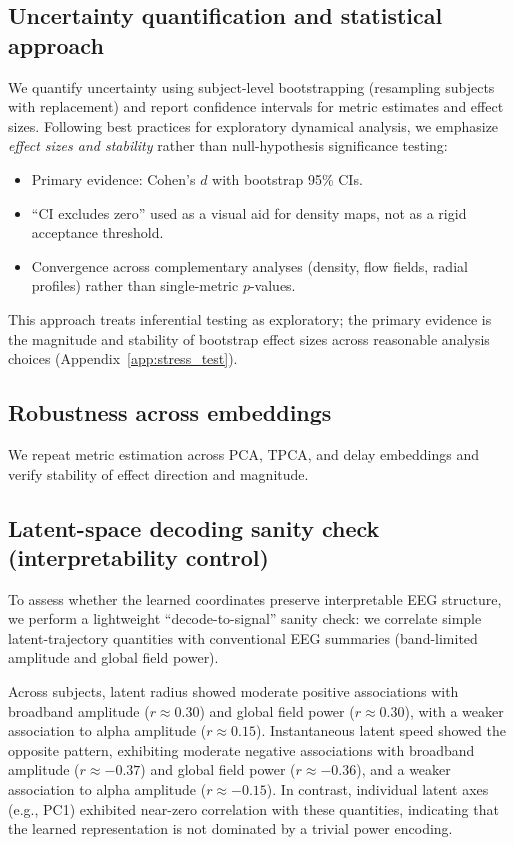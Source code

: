 \documentclass[5p,twocolumn,authoryear]{elsarticle}
\begin{document}
\subsection{Uncertainty quantification and statistical approach}
We quantify uncertainty using subject-level bootstrapping (resampling subjects with replacement) and report confidence intervals for metric estimates and effect sizes. Following best practices for exploratory dynamical analysis, we emphasize \emph{effect sizes and stability} rather than null-hypothesis significance testing:
\begin{itemize}
    \item Primary evidence: Cohen's $d$ with bootstrap 95\% CIs.
    \item ``CI excludes zero'' used as a visual aid for density maps, not as a rigid acceptance threshold.
    \item Convergence across complementary analyses (density, flow fields, radial profiles) rather than single-metric $p$-values.
\end{itemize}
This approach treats inferential testing as exploratory; the primary evidence is the magnitude and stability of bootstrap effect sizes across reasonable analysis choices (Appendix~\ref{app:stress_test}).

\subsection{Robustness across embeddings}
We repeat metric estimation across PCA, TPCA, and delay embeddings and verify stability of effect direction and magnitude.

\subsection{Latent-space decoding sanity check (interpretability control)}
To assess whether the learned coordinates preserve interpretable EEG structure, we perform a lightweight ``decode-to-signal'' sanity check: we correlate simple latent-trajectory quantities with conventional EEG summaries (band-limited amplitude and global field power).

Across subjects, latent radius showed moderate positive associations with broadband amplitude ($r\approx 0.30$) and global field power ($r\approx 0.30$), with a weaker association to alpha amplitude ($r\approx 0.15$). Instantaneous latent speed showed the opposite pattern, exhibiting moderate negative associations with broadband amplitude ($r\approx -0.37$) and global field power ($r\approx -0.36$), and a weaker association to alpha amplitude ($r\approx -0.15$). In contrast, individual latent axes (e.g., PC1) exhibited near-zero correlation with these quantities, indicating that the learned representation is not dominated by a trivial power encoding.
\end{document}
